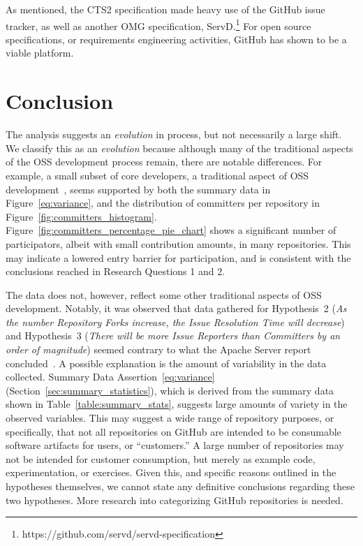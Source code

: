 \documentclass{proc}
\begin{document}
{{{{{As mentioned, the CTS2 specification made heavy use of the GitHub issue tracker, as well as another OMG\textsuperscript{\textregistered} specification, ServD.\footnote{https://github.com/servd/servd-specification} For open source specifications, or requirements engineering activities, GitHub has shown to be a viable platform. 

\section{Conclusion}
The analysis suggests an \textit{evolution} in process, but not necessarily a large shift. We classify this as an \textit{evolution} because although many of the traditional aspects of the OSS development process remain, there are notable differences. For example, a small subset of core developers, a traditional aspect of OSS development~\cite{mockus2000case,mockus2002two,krishnamurthy2002cave}, seems supported by both the summary data in Figure~\ref{eq:variance}, and the distribution of committers per repository in Figure~\ref{fig:committers_histogram}. Figure~\ref{fig:committers_percentage_pie_chart} shows a significant number of participators, albeit with small contribution amounts, in many repositories. This may indicate a lowered entry barrier for participation, and is consistent with the conclusions reached in Research Questions 1 and 2.

The data does not, however, reflect some other traditional aspects of OSS development. Notably, it was observed that data gathered for Hypothesis~2 (\textit{As the number Repository Forks increase, the Issue Resolution Time will decrease}) and Hypothesis~3 (\textit{There will be more Issue Reporters than Committers by an order of magnitude}) seemed contrary to what the Apache Server report concluded~\cite{mockus2000case}. A possible explanation is the amount of variability in the data collected. Summary Data Assertion~\ref{eq:variance} (Section~\ref{sec:summary_statistics}), which is derived from the summary data shown in Table~\ref{table:summary_stats}, suggests large amounts of variety in the observed variables. This may suggest a wide range of repository purposes, or specifically, that not all repositories on GitHub are intended to be consumable software artifacts for users, or ``customers.'' A large number of repositories may not be intended for customer consumption, but merely as example code, experimentation, or exercises. Given this, and specific reasons outlined in the hypotheses themselves, we cannot state any definitive conclusions regarding these two hypotheses. More research into categorizing GitHub repositories is needed.

}}}}}
\end{document}
